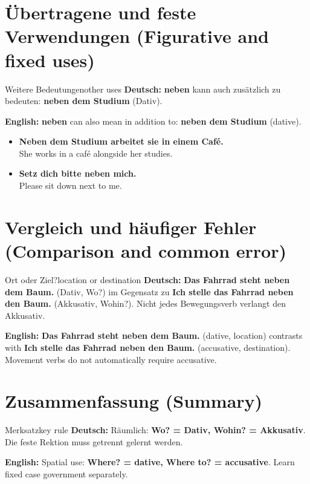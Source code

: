\documentclass[a4paper,11pt]{article}
\newcommand{\GermanText}[1]{\textbf{Deutsch: }#1\par}
\newcommand{\EnglishText}[1]{{\small\color{SoftGray}\textbf{English: }#1\par}}
\newcommand{\ExampleItem}[2]{\item \textbf{#1}\\{\small\color{SoftGray}#2}}
\begin{document}
\section{Übertragene und feste Verwendungen (Figurative and fixed uses)}
\begin{grammarentry}{Weitere Bedeutungen}{other uses}
\GermanText{\textbf{neben} kann auch \glqq zusätzlich zu\grqq{} bedeuten: \textbf{neben dem Studium} (Dativ).}
\EnglishText{\textbf{neben} can also mean in addition to: \textbf{neben dem Studium} (dative).}
\end{grammarentry}
\begin{exbox}
\begin{itemize}
\ExampleItem{Neben dem Studium arbeitet sie in einem Café.}{She works in a café alongside her studies.}
\ExampleItem{Setz dich bitte neben mich.}{Please sit down next to me.}
\end{itemize}
\end{exbox}
\section{Vergleich und häufiger Fehler (Comparison and common error)}
\begin{grammarentry}{Ort oder Ziel?}{location or destination}
\GermanText{\textbf{Das Fahrrad steht neben dem Baum.} (Dativ, Wo?) im Gegensatz zu \textbf{Ich stelle das Fahrrad neben den Baum.} (Akkusativ, Wohin?). Nicht jedes Bewegungsverb verlangt den Akkusativ.}
\EnglishText{\textbf{Das Fahrrad steht neben dem Baum.} (dative, location) contrasts with \textbf{Ich stelle das Fahrrad neben den Baum.} (accusative, destination). Movement verbs do not automatically require accusative.}
\end{grammarentry}
\section{Zusammenfassung (Summary)}
\begin{grammarentry}{Merksatz}{key rule}
\GermanText{Räumlich: \textbf{Wo? = Dativ, Wohin? = Akkusativ}. Die feste Rektion muss getrennt gelernt werden.}
\EnglishText{Spatial use: \textbf{Where? = dative, Where to? = accusative}. Learn fixed case government separately.}
\end{grammarentry}
\end{document}
